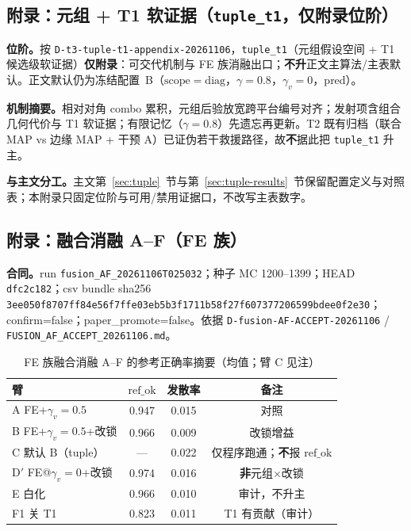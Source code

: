 \documentclass[UTF8,a4paper,zihao=-4]{ctexart}
\begin{document}
\subsection{附录：元组 + T1 软证据（\texttt{tuple\_t1}，仅附录位阶）}\label{sup:tuple-t1-appendix}

\textbf{位阶。}按 \texttt{D-t3-tuple-t1-appendix-20261106}，\texttt{tuple\_t1}（元组假设空间 + T1 候选级软证据）\textbf{仅附录}：可交代机制与 FE 族消融出口；\textbf{不升}正文主算法/主表默认。正文默认仍为冻结配置~B（$\mathrm{scope}=\mathrm{diag}$，$\gamma=0.8$，$\gamma_v=0$，pred）。

\textbf{机制摘要。}相对对角 combo 累积，元组后验放宽跨平台编号对齐；发射项含组合几何代价与 T1 软证据；有限记忆（$\gamma=0.8$）先遗忘再更新。T2 既有归档（联合 MAP vs 边缘 MAP + 干预 A）已证伪若干救援路径，故\textbf{不}据此把 \texttt{tuple\_t1} 升主。

\textbf{与主文分工。}主文第~\ref{sec:tuple}~节与第~\ref{sec:tuple-results}~节保留配置定义与对照表；本附录只固定位阶与可用/禁用证据口，不改写主表数字。

\subsection{附录：融合消融 A--F（FE 族）}\label{sup:fusion-af}

\textbf{合同。}run \texttt{fusion\_AF\_20261106T025032}；种子 MC 1200--1399；HEAD \texttt{dfc2c182}；csv bundle sha256 \texttt{3ee050f8707ff84e56f7ffe03eb5b3f1711b58f27f607377206599bdee0f2e30}；confirm=false；paper\_promote=false。依据 \texttt{D-fusion-AF-ACCEPT-20261106} / \texttt{FUSION\_AF\_ACCEPT\_20261106.md}。

\begin{table}[htbp]
\centering
\caption{FE 族融合消融 A--F 的参考正确率摘要（均值；臂 C 见注）}\label{tab:fusion-af}
\small
\begin{tabular}{@{}lccc@{}}
\toprule
臂 & $\mathrm{ref\_ok}$ & 发散率 & 备注 \\
\midrule
A FE+$\gamma_v=0.5$ & 0.947 & 0.015 & 对照 \\
B FE+$\gamma_v=0.5$+改锁 & 0.966 & 0.009 & 改锁增益 \\
C 默认 B（tuple） & --- & 0.022 & 仅程序跑通；\textbf{不}报 $\mathrm{ref\_ok}$ \\
D$'$ FE@$\gamma_v=0$+改锁 & 0.974 & 0.016 & \textbf{非}元组$\times$改锁 \\
E 白化 & 0.966 & 0.010 & 审计，不升主 \\
F1 关 T1 & 0.823 & 0.011 & T1 有贡献（审计） \\
\bottomrule
\end{tabular}
\end{table}
\end{document}

